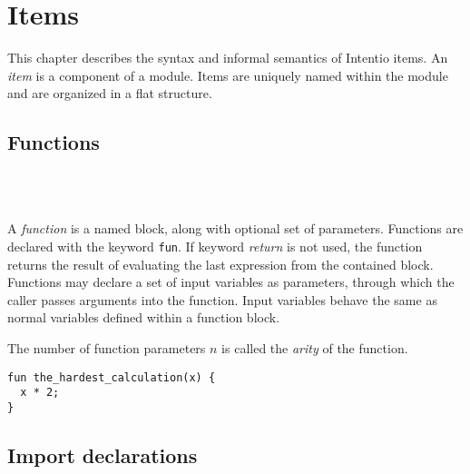\chapter{Items}

This chapter describes the syntax and informal semantics of Intentio items. An \emph{item} is a component of a module. Items are uniquely named within the module and are organized in a flat structure.

\begin{bnf}
   \eq    {}    
                \gorln {} 
\end{bnf}

\section{Functions}

\begin{bnf}
   \eq {} \  \ \term{(} \  \ \term{)} \  \\
   \eq {} \  \ \gtry{\term{,}}
\end{bnf}

A \emph{function} is a named block, along with optional set of parameters. Functions are declared with the keyword \lstinline{fun}. If keyword \emph{return} is not used, the function returns the result of evaluating the last expression from the contained block. Functions may declare a set of input variables as parameters, through which the caller passes arguments into the function. Input variables behave the same as normal variables defined within a function block.

The number of function parameters $n$ is called the \emph{arity} of the function.

\begin{example}
\begin{lstlisting}
fun the_hardest_calculation(x) {
  x * 2;
}
\end{lstlisting}
\end{example}

\section{Import declarations}

\begin{bnf}
   \eq {} \  \\
  \\
   \eq    {} 
                  \gorln {} \  \  
                  \gorln {} \ \term{:} \  
                  \gorln {} \ \term{:} \  \  \  
                  \gorln {} \ \term{:} \ \term{*} 
\end{bnf}


